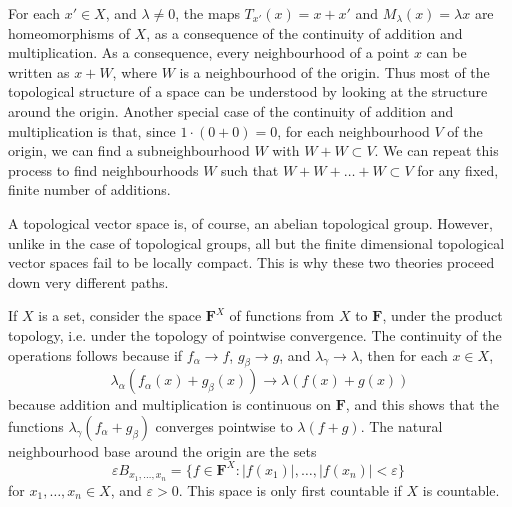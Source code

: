 For each $x' \in X$, and $\lambda \neq 0$, the maps $T_{x'}(x) = x + x'$ and $M_\lambda(x) = \lambda x$ are homeomorphisms of $X$, as a consequence of the continuity of addition and multiplication. As a consequence, every neighbourhood of a point $x$ can be written as $x + W$, where $W$ is a neighbourhood of the origin. Thus most of the topological structure of a space can be understood by looking at the structure around the origin. Another special case of the continuity of addition and multiplication is that, since $1 \cdot (0 + 0) = 0$, for each neighbourhood $V$ of the origin, we can find a subneighbourhood $W$ with $W + W \subset V$. We can repeat this process to find neighbourhoods $W$ such that $W + W + \dots + W \subset V$ for any fixed, finite number of additions.

\begin{remark}
    A topological vector space is, of course, an abelian topological group. However, unlike in the case of topological groups, all but the finite dimensional topological vector spaces fail to be locally compact. This is why these two theories proceed down very different paths.
\end{remark}

%
%

\begin{example}
    If $X$ is a set, consider the space $\mathbf{F}^X$ of functions from $X$ to $\mathbf{F}$, under the product topology, i.e. under the topology of pointwise convergence. The continuity of the operations follows because if $f_\alpha \to f$, $g_\beta \to g$, and $\lambda_\gamma \to \lambda$, then for each $x \in X$,
    \[ \lambda_\alpha (f_\alpha(x) + g_\beta(x)) \to \lambda( f(x) + g(x)) \]
    because addition and multiplication is continuous on $\mathbf{F}$, and this shows that the functions $\lambda_\gamma (f_\alpha + g_\beta)$ converges pointwise to $\lambda(f + g)$. The natural neighbourhood base around the origin are the sets
    \[ \varepsilon B_{x_1, \dots, x_n} = \{ f \in \mathbf{F}^X : |f(x_1)|, \dots, |f(x_n)| < \varepsilon \}\ \]
    for $x_1, \dots, x_n \in X$, and $\varepsilon > 0$. This space is only first countable if $X$ is countable.
\end{example}

